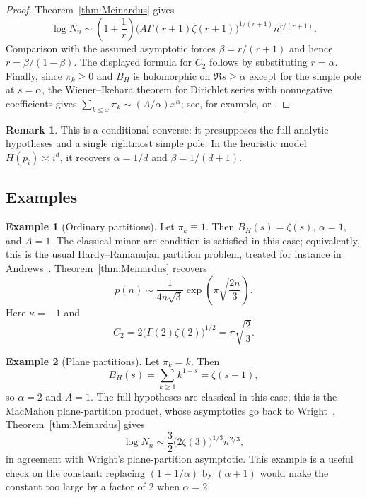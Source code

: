 \documentclass[11pt]{article}
\theoremstyle{definition}
\newtheorem{remark}{Remark}
\newtheorem{example}{Example}
\begin{document}
\begin{proof}
Theorem~\ref{thm:Meinardus} gives
\[
  \log N_n\sim
  \left(1+\frac1r\right)
  \bigl(A\Gamma(r+1)\zeta(r+1)\bigr)^{1/(r+1)}n^{r/(r+1)}.
\]
Comparison with the assumed asymptotic forces $\beta=r/(r+1)$ and hence
$r=\beta/(1-\beta)$.  The displayed formula for $C_2$ follows by substituting
$r=\alpha$.  Finally, since $\pi_k\ge0$ and $B_H$ is holomorphic on
$\Re s\ge\alpha$ except for the simple pole at $s=\alpha$, the
Wiener--Ikehara theorem for Dirichlet series with nonnegative coefficients gives
$\sum_{k\le x}\pi_k\sim(A/\alpha)x^\alpha$; see, for example,
\cite[Theorem~III.1]{tenenbaum} or \cite[Ch.~V, \S4]{korevaar}.
\end{proof}

\begin{remark}
This is a conditional converse: it presupposes the full analytic hypotheses and
a single rightmost simple pole.  In the heuristic model $H(p_i)\asymp i^d$, it
recovers $\alpha=1/d$ and $\beta=1/(d+1)$.
\end{remark}

\subsection{Examples}

\begin{example}[Ordinary partitions]
\label{ex:ordinary-partitions-inverse}
Let $\pi_k\equiv1$.  Then $B_H(s)=\zeta(s)$, $\alpha=1$, and $A=1$.  The
classical minor-arc condition is satisfied in this case; equivalently, this is
the usual Hardy--Ramanujan partition problem, treated for instance in
Andrews~\cite[Ch.~5--6]{andrews}.  Theorem~\ref{thm:Meinardus} recovers
\[
  p(n)\sim \frac{1}{4n\sqrt3}\exp\!\left(\pi\sqrt{\frac{2n}{3}}\right).
\]
Here $\kappa=-1$ and
\[
  C_2=2\bigl(\Gamma(2)\zeta(2)\bigr)^{1/2}
  =\pi\sqrt{\frac23}.
\]
\end{example}

\begin{example}[Plane partitions]
\label{ex:plane-partitions-inverse}
Let $\pi_k=k$.  Then
\[
  B_H(s)=\sum_{k\ge1}k^{1-s}=\zeta(s-1),
\]
so $\alpha=2$ and $A=1$.  The full hypotheses are classical in this case; this
is the MacMahon plane-partition product, whose asymptotics go back to
Wright~\cite{wright}.  Theorem~\ref{thm:Meinardus} gives
\[
  \log N_n\sim \frac32\bigl(2\zeta(3)\bigr)^{1/3}n^{2/3},
\]
in agreement with Wright's plane-partition asymptotic.  This example is a useful
check on the constant: replacing $(1+1/\alpha)$ by $(\alpha+1)$ would make the
constant too large by a factor of $2$ when $\alpha=2$.
\end{example}
\end{document}
